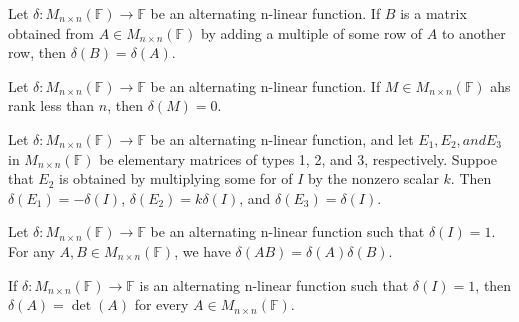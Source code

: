 \newpage
\begin{corollary}
    Let \(\delta: M_{n \times n}(\mathbb{F}) \to \mathbb{F}\) be an alternating n-linear function. If \(B\) is a matrix obtained from \(A \in M_{n \times n}(\mathbb{F})\) by adding a multiple of some row of \(A\) to another row, then \(\delta(B) = \delta(A)\).
\end{corollary}
\vspace{3cm}
\begin{corollary}
    Let \(\delta: M_{n \times n}(\mathbb{F}) \to \mathbb{F}\) be an alternating n-linear function. If \(M \in M_{n \times n}(\mathbb{F})\) ahs rank less than \(n\), then \(\delta(M) = 0\).
\end{corollary}
\vspace{2cm}
\begin{corollary}
    Let \(\delta: M_{n \times n}(\mathbb{F}) \to \mathbb{F}\) be an alternating n-linear function, and let \(E_1,E_2, and E_3\) in \(M_{n \times n}(\mathbb{F})\) be elementary matrices of types 1, 2, and 3, respectively. Suppoe that \(E_2\) is obtained by multiplying some for of \(I\) by the nonzero scalar \(k\). Then \(\delta(E_1) = -\delta(I)\), \(\delta(E_2) = k \delta(I)\), and \(\delta(E_3) = \delta(I)\).
\end{corollary}
\vspace{2cm}
\begin{theorem}
    Let \(\delta: M_{n \times n}(\mathbb{F}) \to \mathbb{F}\) be an alternating n-linear function such that \(\delta(I) = 1\). For any \(A,B \in M_{n \times n}(\mathbb{F})\), we have \(\delta(AB) = \delta(A) \delta(B)\).
\end{theorem}
\vspace{2cm}
\begin{theorem}
    If \(\delta: M_{n \times n}(\mathbb{F}) \to \mathbb{F}\) is an alternating n-linear function such that \(\delta(I) = 1\), then \(\delta(A) = \det(A)\) for every \(A \in M_{n \times n}(\mathbb{F})\).
\end{theorem}
\vspace{5cm}
